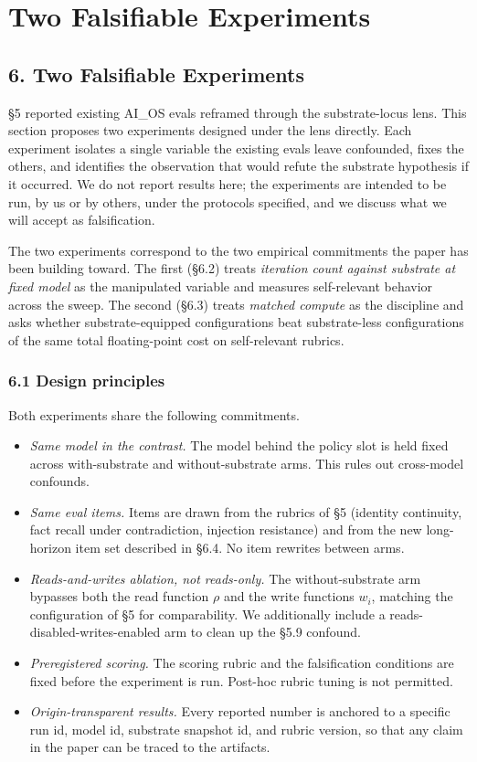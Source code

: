 \documentclass[11pt,letterpaper]{article}
\begin{document}
\section{Two Falsifiable Experiments}
\subsection*{6. Two Falsifiable Experiments}

§5 reported existing AI\_OS evals reframed through the substrate-locus lens. This section proposes two experiments designed under the lens directly. Each experiment isolates a single variable the existing evals leave confounded, fixes the others, and identifies the observation that would refute the substrate hypothesis if it occurred. We do not report results here; the experiments are intended to be run, by us or by others, under the protocols specified, and we discuss what we will accept as falsification.

The two experiments correspond to the two empirical commitments the paper has been building toward. The first (§6.2) treats \emph{iteration count against substrate at fixed model} as the manipulated variable and measures self-relevant behavior across the sweep. The second (§6.3) treats \emph{matched compute} as the discipline and asks whether substrate-equipped configurations beat substrate-less configurations of the same total floating-point cost on self-relevant rubrics.

\subsubsection*{6.1 Design principles}

Both experiments share the following commitments.

\begin{itemize}
  \item \emph{Same model in the contrast.} The model behind the policy slot is held fixed across with-substrate and without-substrate arms. This rules out cross-model confounds.
  \item \emph{Same eval items.} Items are drawn from the rubrics of §5 (identity continuity, fact recall under contradiction, injection resistance) and from the new long-horizon item set described in §6.4. No item rewrites between arms.
  \item \emph{Reads-and-writes ablation, not reads-only.} The without-substrate arm bypasses both the read function $\rho$ and the write functions $w_i$, matching the configuration of §5 for comparability. We additionally include a reads-disabled-writes-enabled arm to clean up the §5.9 confound.
  \item \emph{Preregistered scoring.} The scoring rubric and the falsification conditions are fixed before the experiment is run. Post-hoc rubric tuning is not permitted.
  \item \emph{Origin-transparent results.} Every reported number is anchored to a specific run id, model id, substrate snapshot id, and rubric version, so that any claim in the paper can be traced to the artifacts.
\end{itemize}
\end{document}
